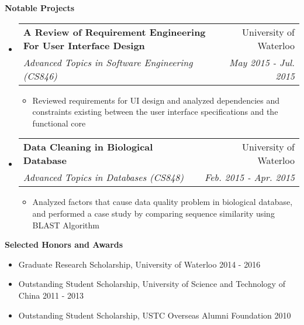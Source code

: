 \documentclass[letterpaper,10pt]{article}
\makeatletter
\newcommand{\resitem}[1]{\item #1 \vspace{-2pt}}
\newcommand{\resheading}[1]{{\large \colorbox{mygrey}{\begin{minipage}{\textwidth}{\textbf{#1 \vphantom{p\^{E}}}}\end{minipage}}}}
\newcommand{\ressubheading}[4]{
\begin{tabular*}{7.0in}{l@{\extracolsep{\fill}}r}
		\textbf{#1} & #2 \\
		\textit{#3} & \textit{#4} \\
\end{tabular*}\vspace{-6pt}}
\makeatother
\begin{document}
\resheading{Notable Projects}
\begin{itemize}
\itemsep0em
\item
	\ressubheading{A Review of Requirement Engineering For User Interface Design}{University of Waterloo}{Advanced Topics in Software Engineering (CS846)}{May 2015 - Jul. 2015}
	\begin{itemize}
		\resitem{Reviewed requirements for UI design and analyzed dependencies and constraints existing between the user interface specifications and the functional core}
	\end{itemize}
\item
	\ressubheading{Data Cleaning in Biological Database}{University of Waterloo}{ Advanced Topics in Databases (CS848)}{ Feb. 2015 - Apr. 2015}
	\begin{itemize}
		\resitem{Analyzed factors that cause data quality problem in biological database, and performed a case study by comparing sequence similarity using BLAST Algorithm}
	\end{itemize}
	
\end{itemize}




\resheading{Selected Honors and Awards}
\begin{itemize}
\itemsep0em
\item {Graduate Research Scholarship, University of Waterloo \hfill 2014 - 2016}
\item {Outstanding Student Scholarship, University of Science and Technology of China \hfill 2011 - 2013}
\item {Outstanding Student Scholarship, USTC Overseas Alumni Foundation \hfill 2010}
\end{itemize}
\end{document}
